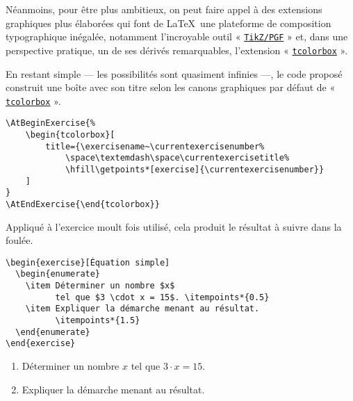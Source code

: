 \documentclass[
  twocolumn,%
  fontsize=9pt,%
  DIV=calc,%
  numbers=noendperiod%
]{scrartcl}
\begin{document}
Néanmoins, pour être plus ambitieux, on peut faire appel à des extensions graphiques plus élaborées qui font de \LaTeX\ une plateforme de composition typographique inégalée, notamment l'incroyable outil « \href{https://www.ctan.org/pkg/pgf}{\texttt{TikZ/PGF}} » et, dans une perspective pratique, un de ses dérivés remarquables, l'extension « \href{https://www.ctan.org/pkg/tcolorbox}{\texttt{tcolorbox}} ».

En restant simple --- les possibilités sont quasiment infinies ---, le code proposé construit une boîte avec son titre selon les canons graphiques par défaut de « \href{https://www.ctan.org/pkg/tcolorbox}{\texttt{tcolorbox}} ».

\begin{lstlisting}
\AtBeginExercise{%
	\begin{tcolorbox}[
		title={\exercisename~\currentexercisenumber%
			\space\textemdash\space\currentexercisetitle%
			\hfill\getpoints*[exercise]{\currentexercisenumber}}
	]
}
\AtEndExercise{\end{tcolorbox}}
\end{lstlisting}

\AtBeginExercise{%
	\begin{tcolorbox}[
		title={\exercisename~\currentexercisenumber%
			\space\textemdash\space\currentexercisetitle%
			\hfill\getpoints*[exercise]{\currentexercisenumber}},
		fonttitle=\sffamily\bfseries
	]
}
\AtEndExercise{\end{tcolorbox}}

Appliqué à l'exercice moult fois utilisé, cela produit le résultat à suivre dans la foulée.

\begin{lstlisting}
\begin{exercise}[Équation simple]
  \begin{enumerate}
    \item Déterminer un nombre $x$ 
          tel que $3 \cdot x = 15$. \itempoints*{0.5}
    \item Expliquer la démarche menant au résultat. 
          \itempoints*{1.5}
  \end{enumerate}
\end{exercise}
\end{lstlisting}

\begin{exercise}
  \begin{enumerate}
    \item Déterminer un nombre $x$ tel que $3 \cdot x = 15$. 
    \item Expliquer la démarche menant au résultat. 
  \end{enumerate}
\end{exercise}
\end{document}
